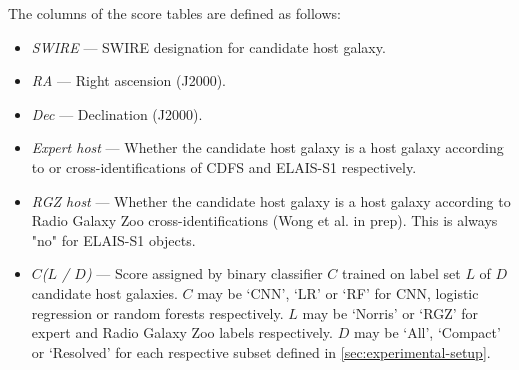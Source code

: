   The columns of the score tables are defined as follows:
  \begin{itemize}
    \item \emph{SWIRE} --- SWIRE designation for candidate host galaxy.
    \item \emph{RA} --- Right ascension (J2000).
    \item \emph{Dec} --- Declination (J2000).
    \item \emph{Expert host} --- Whether the candidate host galaxy is a host galaxy according to \citet{norris06} or \citet{middelberg08} cross-identifications of CDFS and ELAIS-S1 respectively.
    \item \emph{RGZ host} --- Whether the candidate host galaxy is a host galaxy according to Radio Galaxy Zoo cross-identifications (Wong et al. in prep). This is always "no" for ELAIS-S1 objects.
    \item \emph{$C$($L$ / $D$)} --- Score assigned by binary classifier $C$ trained on label set $L$ of $D$ candidate host galaxies. $C$ may be `CNN', `LR' or `RF' for CNN, logistic regression or random forests respectively. $L$ may be `Norris' or `RGZ' for expert and Radio Galaxy Zoo labels respectively. $D$ may be `All', `Compact' or `Resolved' for each respective subset defined in \autoref{sec:experimental-setup}.
  \end{itemize}

